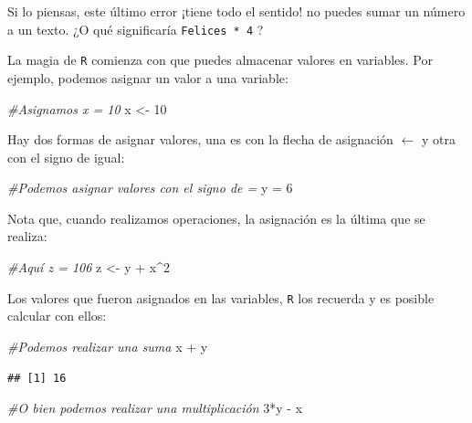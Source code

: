 \documentclass[]{tufte-book}
\newenvironment{Shaded}{}{}
\newcommand{\CommentTok}[1]{\textcolor[rgb]{0.38,0.63,0.69}{\textit{#1}}}
\newcommand{\DecValTok}[1]{\textcolor[rgb]{0.25,0.63,0.44}{#1}}
\newcommand{\NormalTok}[1]{#1}
\newcommand{\OtherTok}[1]{\textcolor[rgb]{0.00,0.44,0.13}{#1}}
\newcommand{\SpecialCharTok}[1]{\textcolor[rgb]{0.25,0.44,0.63}{#1}}
\begin{document}
Si lo piensas, este último error ¡tiene todo el sentido! no puedes sumar
un número a un texto. ¿O qué significaría
\texttt{\textquotesingle{}Felices\textquotesingle{}\ *\ 4} ?

La magia de \texttt{R} comienza con que puedes almacenar valores en
variables. Por ejemplo, podemos asignar un valor a una variable:

\begin{Shaded}
\begin{Highlighting}[]
\CommentTok{\#Asignamos x = 10}
\NormalTok{x }\OtherTok{\textless{}{-}} \DecValTok{10}
\end{Highlighting}
\end{Shaded}

Hay dos formas de asignar valores, una es con la flecha de asignación
\(\leftarrow\) y otra con el signo de igual:

\begin{Shaded}
\begin{Highlighting}[]
\CommentTok{\#Podemos asignar valores con el signo de =}
\NormalTok{y }\OtherTok{=} \DecValTok{6}
\end{Highlighting}
\end{Shaded}

Nota que, cuando realizamos operaciones, la asignación es la última que
se realiza:

\begin{Shaded}
\begin{Highlighting}[]
\CommentTok{\#Aquí z = 106}
\NormalTok{z }\OtherTok{\textless{}{-}}\NormalTok{ y }\SpecialCharTok{+}\NormalTok{ x}\SpecialCharTok{\^{}}\DecValTok{2}
\end{Highlighting}
\end{Shaded}

Los valores que fueron asignados en las variables, \texttt{R} los
recuerda y es posible calcular con ellos:

\begin{Shaded}
\begin{Highlighting}[]
\CommentTok{\#Podemos realizar una suma}
\NormalTok{x }\SpecialCharTok{+}\NormalTok{ y}
\end{Highlighting}
\end{Shaded}

\begin{verbatim}
## [1] 16
\end{verbatim}

\begin{Shaded}
\begin{Highlighting}[]
\CommentTok{\#O bien podemos realizar una multiplicación}
\DecValTok{3}\SpecialCharTok{*}\NormalTok{y }\SpecialCharTok{{-}}\NormalTok{ x}
\end{Highlighting}
\end{Shaded}
\end{document}
